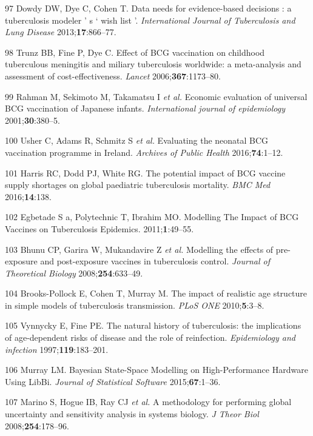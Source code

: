 \documentclass[11pt,twoside]{bristolthesis}
\begin{document}
  \leavevmode\hypertarget{ref-Dowdy2012}{}%
  97 Dowdy DW, Dye C, Cohen T. Data needs for evidence-based decisions : a tuberculosis modeler ' s ` wish list '. \emph{International Journal of Tuberculosis and Lung Disease} 2013;\textbf{17}:866--77.
  
  \leavevmode\hypertarget{ref-Trunz2006}{}%
  98 Trunz BB, Fine P, Dye C. Effect of BCG vaccination on childhood tuberculous meningitis and miliary tuberculosis worldwide: a meta-analysis and assessment of cost-effectiveness. \emph{Lancet} 2006;\textbf{367}:1173--80.
  
  \leavevmode\hypertarget{ref-Rahman2001a}{}%
  99 Rahman M, Sekimoto M, Takamatsu I \emph{et al.} Economic evaluation of universal BCG vaccination of Japanese infants. \emph{International journal of epidemiology} 2001;\textbf{30}:380--5.
  
  \leavevmode\hypertarget{ref-Usher2016}{}%
  100 Usher C, Adams R, Schmitz S \emph{et al.} Evaluating the neonatal BCG vaccination programme in Ireland. \emph{Archives of Public Health} 2016;\textbf{74}:1--12.
  
  \leavevmode\hypertarget{ref-Harris2016}{}%
  101 Harris RC, Dodd PJ, White RG. The potential impact of BCG vaccine supply shortages on global paediatric tuberculosis mortality. \emph{BMC Med} 2016;\textbf{14}:138.
  
  \leavevmode\hypertarget{ref-Egbetade2011a}{}%
  102 Egbetade S a, Polytechnic T, Ibrahim MO. Modelling The Impact of BCG Vaccines on Tuberculosis Epidemics. 2011;\textbf{1}:49--55.
  
  \leavevmode\hypertarget{ref-Bhunu2008b}{}%
  103 Bhunu CP, Garira W, Mukandavire Z \emph{et al.} Modelling the effects of pre-exposure and post-exposure vaccines in tuberculosis control. \emph{Journal of Theoretical Biology} 2008;\textbf{254}:633--49.
  
  \leavevmode\hypertarget{ref-Brooks-Pollock2010}{}%
  104 Brooks-Pollock E, Cohen T, Murray M. The impact of realistic age structure in simple models of tuberculosis transmission. \emph{PLoS ONE} 2010;\textbf{5}:3--8.
  
  \leavevmode\hypertarget{ref-Vynnycky1997a}{}%
  105 Vynnycky E, Fine PE. The natural history of tuberculosis: the implications of age-dependent risks of disease and the role of reinfection. \emph{Epidemiology and infection} 1997;\textbf{119}:183--201.
  
  \leavevmode\hypertarget{ref-Murray2015}{}%
  106 Murray LM. Bayesian State-Space Modelling on High-Performance Hardware Using LibBi. \emph{Journal of Statistical Software} 2015;\textbf{67}:1--36.
  
  \leavevmode\hypertarget{ref-Marino2009a}{}%
  107 Marino S, Hogue IB, Ray CJ \emph{et al.} A methodology for performing global uncertainty and sensitivity analysis in systems biology. \emph{J Theor Biol} 2008;\textbf{254}:178--96.


\end{document}
